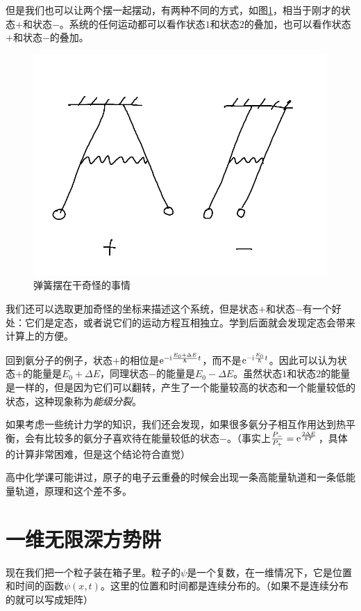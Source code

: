 但是我们也可以让两个摆一起摆动，有两种不同的方式，如图\ref{fig-spring-pend-2}，相当于刚才的状态$+$和状态$-$。系统的任何运动都可以看作状态$1$和状态$2$的叠加，也可以看作状态$+$和状态$-$的叠加。
\begin{figure}[htb]
\centering
\includegraphics[scale=0.5]{fig/spring-pend-2.png}
\caption{弹簧摆在干奇怪的事情}
\label{fig-spring-pend-2}
\end{figure}

我们还可以选取更加奇怪的坐标来描述这个系统，但是状态$+$和状态$-$有一个好处：它们是定态，或者说它们的运动方程互相独立。学到后面就会发现定态会带来计算上的方便。

回到氨分子的例子，状态$+$的相位是$\mathrm{e}^{-\mathrm{i} \frac{E_0+\Delta E}{\hbar} t}$，而不是$\mathrm{e}^{-\mathrm{i} \frac{E_0}{\hbar} t}$。因此可以认为状态$+$的能量是$E_0+\Delta E$，同理状态$-$的能量是$E_0-\Delta E$。虽然状态$1$和状态$2$的能量是一样的，但是因为它们可以翻转，产生了一个能量较高的状态和一个能量较低的状态，这种现象称为\emph{能级分裂}。

如果考虑一些统计力学的知识，我们还会发现，如果很多氨分子相互作用达到热平衡，会有比较多的氨分子喜欢待在能量较低的状态$-$。（事实上$\frac{P_-}{P_+}=\mathrm{e}^{\frac{2 \Delta E}{k T}}$，具体的计算非常困难，但是这个结论符合直觉）

高中化学课可能讲过，原子的电子云重叠的时候会出现一条高能量轨道和一条低能量轨道，原理和这个差不多。
\section{一维无限深方势阱}
现在我们把一个粒子装在箱子里。粒子的$\psi$是一个复数，在一维情况下，它是位置和时间的函数$\psi(x,t)$。这里的位置和时间都是连续分布的。（如果不是连续分布的就可以写成矩阵）

